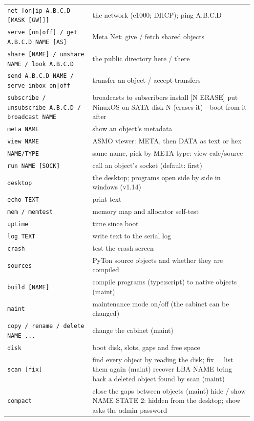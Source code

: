 \begin{longtable}{@{}p{5.2cm} p{9.8cm}@{}}
\texttt{net [on|ip A.B.C.D [MASK [GW]]]} & the network (e1000; DHCP); ping A.B.C.D \\
\texttt{serve [on|off] / get A.B.C.D NAME [AS]} & Meta Net: give / fetch shared objects \\
\texttt{share [NAME] / unshare NAME / look A.B.C.D} & the public directory here / there \\
\texttt{send A.B.C.D NAME / serve inbox on|off} & transfer an object / accept transfers \\
\texttt{subscribe / unsubscribe A.B.C.D / broadcast NAME} & broadcasts to subscribers install [N ERASE] put NinuxOS on SATA disk N (erases it) - boot from it after \\
\texttt{meta NAME} & show an object's metadata \\
\texttt{view NAME} & ASMO viewer: META, then DATA as text or hex \\
\texttt{NAME/TYPE} & same name, pick by META type: view calc/source \\
\texttt{run NAME [SOCK]} & call an object's socket (default: first) \\
\texttt{desktop} & the desktop; programs open side by side in windows (v1.14) \\
\texttt{echo TEXT} & print text \\
\texttt{mem / memtest} & memory map and allocator self-test \\
\texttt{uptime} & time since boot \\
\texttt{log TEXT} & write text to the serial log \\
\texttt{crash} & test the crash screen \\
\texttt{sources} & PyTon source objects and whether they are compiled \\
\texttt{build [NAME]} & compile programs (type:script) to native objects (maint) \\
\texttt{maint} & maintenance mode on/off (the cabinet can be changed) \\
\texttt{copy / rename / delete NAME ...} & change the cabinet (maint) \\
\texttt{disk} & boot disk, slots, gaps and free space \\
\texttt{scan [fix]} & find every object by reading the disk; fix = list them again (maint) recover LBA NAME bring back a deleted object found by scan (maint) \\
\texttt{compact} & close the gaps between objects (maint) hide / show NAME STATE 2: hidden from the desktop; show asks the admin password \\

\end{longtable}
